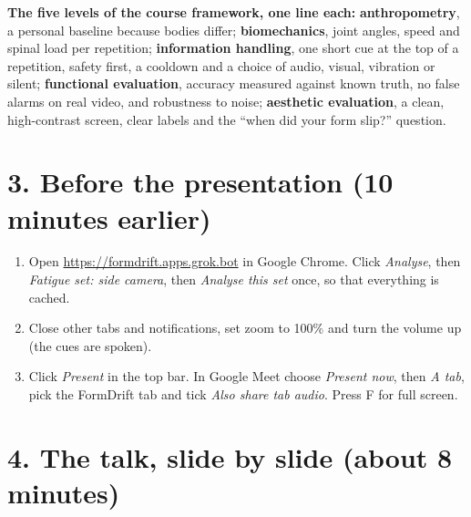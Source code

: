 \documentclass[11pt]{article}
\newcommand{\key}[1]{\textcolor{keyred}{\textbf{#1}}}
\begin{document}
\textbf{The five levels of the course framework, one line each:} \key{anthropometry}, a personal baseline because bodies differ; \key{biomechanics}, joint angles, speed and spinal load per repetition; \key{information handling}, one short cue at the top of a repetition, safety first, a cooldown and a choice of audio, visual, vibration or silent; \key{functional evaluation}, accuracy measured against known truth, no false alarms on real video, and robustness to noise; \key{aesthetic evaluation}, a clean, high-contrast screen, clear labels and the ``when did your form slip?'' question.

\section*{3. Before the presentation (10 minutes earlier)}

\begin{enumerate}
\item Open \url{https://formdrift.apps.grok.bot} in Google Chrome. Click \emph{Analyse}, then \emph{Fatigue set: side camera}, then \emph{Analyse this set} once, so that everything is cached.
\item Close other tabs and notifications, set zoom to 100\% and turn the volume up (the cues are spoken).
\item Click \emph{Present} in the top bar. In Google Meet choose \emph{Present now}, then \emph{A tab}, pick the FormDrift tab and tick \emph{Also share tab audio}. Press F for full screen.
\end{enumerate}

\section*{4. The talk, slide by slide (about 8 minutes)}
\end{document}
